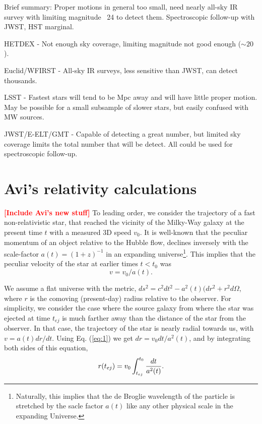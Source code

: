 \documentclass[a4paper,twocolumn]{emulateapj}
\newcommand{\colr}[1]{{\bf \textcolor{red}{[#1]}}}
\begin{document}
\begin{figure}
\label{fig:specs}
\end{figure}

Brief summary: Proper motions in general too small, need nearly all-sky IR survey with limiting magnitude ~24 to detect them. Spectroscopic follow-up with JWST, HST marginal.

HETDEX - Not enough sky coverage, limiting magnitude not good enough ($\sim 20$).

Euclid/WFIRST - All-sky IR surveys, less sensitive than JWST, can detect thousands.

LSST - Fastest stars will tend to be Mpc away and will have little proper motion. May be possible for a small subsample of slower stars, but easily confused with MW sources.

JWST/E-ELT/GMT - Capable of detecting a great number, but limited sky coverage limits the total number that will be detect. All could be used for spectroscopic follow-up.

\section{Avi's relativity calculations}
\colr{Include Avi's new stuff}
To leading order, we consider the trajectory of a fast
non-relativistic star, that reached the vicinity of the Milky-Way
galaxy at the present time $t$ with a measured 3D speed $v_0$. It is
well-known that the peculiar momentum of an object relative to the
Hubble flow, declines inversely with the scale-factor
$a(t)=(1+z)^{-1}$ in an expanding universe\footnote{Naturally, this
implies that the de Broglie wavelength of the particle is stretched by
the sacle factor $a(t)$ like any other physical scale in the expanding
Universe.}. This implies that the peculiar velocity of the star at
earlier times $t<t_0$ was 
\begin{equation}
v=v_0/a(t).
\label{eq:1}
\end{equation}

We assume a flat universe with the metric,
$ds^2=c^2dt^2-a^2(t)(dr^2+r^2d\Omega$, where $r$ is the comoving
(present-day) radius relative to the observer. For simplicity, we
consider the case where the source galaxy from where the star was
ejected at time $t_{ej}$ is much farther away than the distance of the
star from the observer. In that case, the trajectory of the star is
nearly radial towards us, with $v=a(t)dr/dt$. Using Eq. (\ref{eq:1})
we get $dr=v_0 dt/a^2(t)$, and by integrating both sides of this
equation,
\begin{equation}
r(t_{ej})=v_0 \int_{t_{ej}}^{t_0} {dt \over a^2(t)} .
\label{eq:2}
\end{equation}
\end{document}
